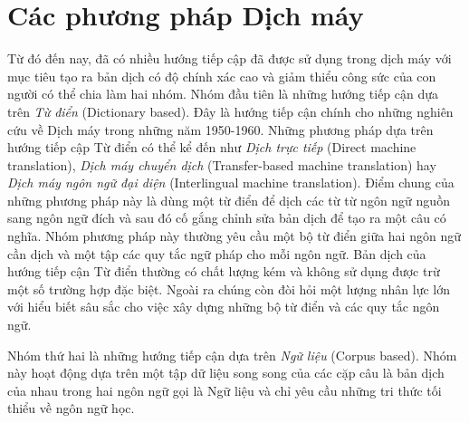

\section{Các phương pháp Dịch máy}
Từ đó đến nay, đã có nhiều hướng tiếp cập đã được sử dụng trong dịch máy với mục tiêu tạo ra bản dịch có độ chính xác cao và giảm thiểu công sức của con người có thể chia làm hai nhóm. Nhóm đầu tiên là những hướng tiếp cận dựa trên \textit{Từ điển} (Dictionary based). Đây là hướng tiếp cận chính cho những nghiên cứu về Dịch máy trong những năm 1950-1960. Những phương pháp dựa trên hướng tiếp cập Từ điển có thể kể đến như \textit{Dịch trực tiếp} (Direct machine translation), \textit{Dịch máy chuyển dịch} (Transfer-based machine translation) hay \textit{Dịch máy ngôn ngữ đại diện} (Interlingual machine translation). Điểm chung của những phương pháp này là dùng một từ điển để dịch các từ từ ngôn ngữ nguồn sang ngôn ngữ đích và sau đó cố gắng chỉnh sửa bản dịch để tạo ra một câu có nghĩa. Nhóm phương pháp này thường yêu cầu một bộ từ điển giữa hai ngôn ngữ cần dịch và một tập các quy tắc ngữ pháp cho mỗi ngôn ngữ. Bản dịch của hướng tiếp cận Từ điển thường có chất lượng kém và không sử dụng được trừ một số trường hợp đặc biệt. Ngoài ra chúng còn đòi hỏi một lượng nhân lực lớn với hiểu biết sâu sắc cho việc xây dựng những bộ từ điển và các quy tắc ngôn ngữ. 

Nhóm thứ hai là những hướng tiếp cận dựa trên \textit{Ngữ liệu} (Corpus based). Nhóm này hoạt động dựa trên một tập dữ liệu song song của các cặp câu là bản dịch của nhau trong hai ngôn ngữ gọi là Ngữ liệu và chỉ yêu cầu những tri thức tối thiểu về ngôn ngữ học.


